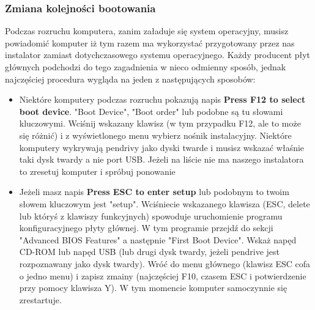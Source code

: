 \subsubsection{Zmiana kolejności bootowania}
Podczas rozruchu komputera, zanim załaduje się system operacyjny, musisz powiadomić komputer iż tym razem ma wykorzystać przygotowany przez nas instalator zamiast dotychczasowego systemu operacyjnego. Każdy producent płyt głównych podchodzi do tego zagadnienia w nieco odmienny sposób, jednak najczęściej procedura wygląda na jeden z następujących sposobów:
\begin{itemize}
\item Niektóre komputery podczas rozruchu pokazują napis \textbf{Press F12 to select boot device}. "Boot Device", "Boot order" lub podobne są tu słowami kluczowymi. Wciśnij wskazany klawisz (w tym przypadku F12, ale to może się różnić) i z wyświetlonego menu wybierz nośnik instalacyjny. Niektóre komputery wykrywają pendrivy jako dyski twarde i musisz wskazać właśnie taki dysk twardy a nie port USB. Jeżeli na liście nie ma naszego instalatora to zresetuj komputer i spróbuj ponowanie
\item Jeżeli masz napis \textbf{Press ESC to enter setup} lub podobnym to twoim słowem kluczowym jest "setup". Wciśniecie wskazanego klawisza (ESC, delete lub któryś z klawiszy funkcyjnych) spowoduje uruchomienie programu konfiguracyjnego płyty głównej. W tym programie przejdź do sekcji "Advanced BIOS Features" a następnie "First Boot Device". Wskaż napęd CD-ROM lub napęd USB (lub drugi dysk twardy, jeżeli pendrive jest rozpoznawany jako dysk twardy). Wróć do menu głównego (klawisz ESC cofa o jedno menu) i zapisz zmainy (najczęściej F10, czasem ESC i potwierdzenie przy pomocy klawisza Y). W tym momencie komputer samoczynnie się zrestartuje.
\end{itemize}